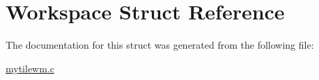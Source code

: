 \hypertarget{structWorkspace}{}\section{Workspace Struct Reference}
\label{structWorkspace}


The documentation for this struct was generated from the following file\+:\begin{DoxyCompactItemize}
\item 
\hyperlink{mytilewm_8c}{mytilewm.\+c}\end{DoxyCompactItemize}
